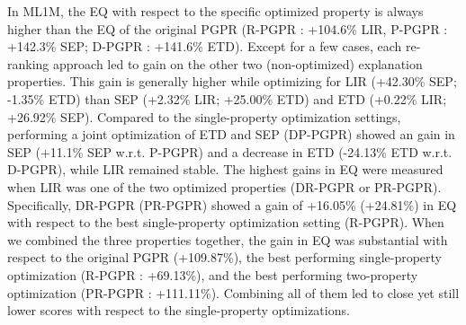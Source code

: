\documentclass[sigconf]{acmart}
\begin{document}
In ML1M, the EQ with respect to the specific optimized property is always higher than the EQ of the original PGPR (R-PGPR : +104.6\% LIR, P-PGPR : +142.3\% SEP; D-PGPR : +141.6\% ETD). 
Except for a few cases, each re-ranking approach led to gain on the other two (non-optimized) explanation properties. 
This gain is generally higher while optimizing for LIR (+42.30\% SEP; -1.35\% ETD) than SEP (+2.32\% LIR; +25.00\% ETD) and ETD (+0.22\% LIR; +26.92\% SEP). 
Compared to the single-property optimization settings, performing a joint optimization of ETD and SEP (DP-PGPR) showed an gain in SEP (+11.1\% SEP w.r.t. P-PGPR) and a decrease in ETD (-24.13\% ETD w.r.t. D-PGPR), while LIR remained stable.
The highest gains in EQ were measured when LIR was one of the two optimized properties (DR-PGPR or PR-PGPR).
Specifically, DR-PGPR (PR-PGPR) showed a gain of +16.05\% (+24.81\%) in EQ with respect to the best single-property optimization setting (R-PGPR). 
When we combined the three properties together, the gain in EQ was substantial with respect to the original PGPR (+109.87\%), the best performing single-property optimization (R-PGPR : +69.13\%), and the best performing two-property optimization (PR-PGPR : +111.11\%).
Combining all of them led to close yet still lower scores with respect to the single-property optimizations.



\begin{table}[!t]
\centering
  \caption{Explanation quality (EQ, LIR, EP, ETD).}
    \label{tab:results-exp-metrics}
\end{table}
\end{document}
